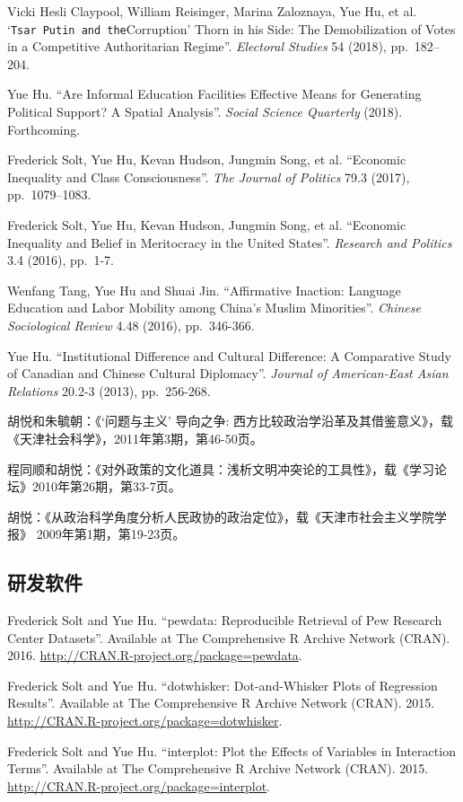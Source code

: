 \documentclass[10.5pt,]{article}
\begin{document}
Vicki Hesli Claypool, William Reisinger, Marina Zaloznaya, Yue Hu, et
al. `\texttt{Tsar\ Putin\ and\ the}Corruption' Thorn in his Side: The
Demobilization of Votes in a Competitive Authoritarian Regime''.
\emph{Electoral Studies} 54 (2018), pp.~182--204.

Yue Hu. ``Are Informal Education Facilities Effective Means for
Generating Political Support? A Spatial Analysis''.
\emph{Social Science Quarterly} (2018). Forthcoming.

Frederick Solt, Yue Hu, Kevan Hudson, Jungmin Song, et al. ``Economic
Inequality and Class Consciousness''. \emph{The Journal of Politics}
79.3 (2017), pp.~1079--1083.

Frederick Solt, Yue Hu, Kevan Hudson, Jungmin Song, et al. ``Economic
Inequality and Belief in Meritocracy in the United States''.
\emph{Research and Politics} 3.4 (2016), pp.~1-7.

Wenfang Tang, Yue Hu and Shuai Jin. ``Affirmative Inaction: Language
Education and Labor Mobility among China's Muslim Minorities''.
\emph{Chinese Sociological Review} 4.48 (2016), pp.~346-366.

Yue Hu. ``Institutional Difference and Cultural Difference: A
Comparative Study of Canadian and Chinese Cultural Diplomacy''.
\emph{Journal of American-East Asian Relations} 20.2-3 (2013),
pp.~256-268.

胡悦和朱毓朝：《`问题与主义' 导向之争:
西方比较政治学沿革及其借鉴意义》，载《天津社会科学》，2011年第3期，第46-50页。

程同顺和胡悦：《对外政策的文化道具：浅析文明冲突论的工具性》，载《学习论坛》2010年第26期，第33-7页。

胡悦：《从政治科学角度分析人民政协的政治定位》，载《天津市社会主义学院学报》
2009年第1期，第19-23页。

\subsection{研发软件}

Frederick Solt and Yue Hu. ``pewdata: Reproducible Retrieval of Pew
Research Center Datasets''. Available at The Comprehensive R Archive
Network (CRAN). 2016. \url{http://CRAN.R-project.org/package=pewdata}.

Frederick Solt and Yue Hu. ``dotwhisker: Dot-and-Whisker Plots of
Regression Results''. Available at The Comprehensive R Archive Network
(CRAN). 2015. \url{http://CRAN.R-project.org/package=dotwhisker}.

Frederick Solt and Yue Hu. ``interplot: Plot the Effects of Variables in
Interaction Terms''. Available at The Comprehensive R Archive Network
(CRAN). 2015. \url{http://CRAN.R-project.org/package=interplot}.
\end{document}

